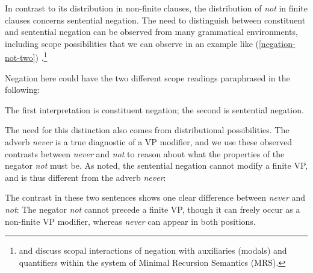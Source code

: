 \documentclass[output=paper
 	        ,biblatex
                ,babelshorthands
                ,newtxmath
                ,draftmode
                ,colorlinks, citecolor=brown
]{langscibook}
\begin{document}
\begin{exe}
\begin{xlist}
\begin{exe}
\begin{xlist}
\eal
{}
\zl

In contrast to its distribution
in non-finite clauses, the distribution
of \textit{not}
 in finite clauses concerns sentential
 negation.
  The need to distinguish between constituent and sentential negation can be
  observed from
  many grammatical environments, including scope
possibilities that we can observe in an example like (\ref{negation-not-two}) \parencites(see){Klima:64}{Baker:91}{Warner2000a-u}[]{kimmichaelis:2020}.\footnote{\citet{Warner2000a-u} and \citet{BL:13}
discuss scopal interactions of negation with auxiliaries (modals) and quantifiers
within the system of Minimal Recursion Semantics (MRS).}

\z
%
Negation here could have the two different scope readings
paraphrased in the following:


\eal
{}
\zl
%
The first interpretation is constituent negation; the second is
sentential negation.


The need for this distinction also comes from
distributional possibilities.
The adverb \textit{never} is a true
diagnostic of a VP modifier, and we use
these observed contrasts
between \textit{never} and \textit{not} to reason about what the properties of the negator \textit{not} must be. As noted, the sentential
negation  cannot modify a finite
VP, and is thus different from the adverb \textit{never}:

\eal
{}
\zl
%
The contrast in these two sentences
shows one clear difference between \textit{never}
and \textit{not}:  The negator \textit{not} cannot
precede a finite VP, though it can freely occur
as a non-finite VP modifier, whereas \textit{never} can appear in both positions.

%
%
%
%


\end{xlist}
\end{exe}
\end{xlist}
\end{exe}
\end{document}
